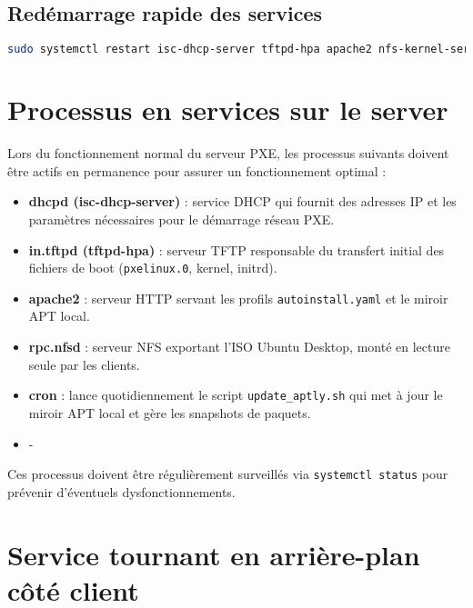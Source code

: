 \documentclass[a4paper,12pt]{article}
\begin{document}
\subsection{Redémarrage rapide des services}

\begin{lstlisting}[language=bash]
sudo systemctl restart isc-dhcp-server tftpd-hpa apache2 nfs-kernel-server
\end{lstlisting}

\section{Processus en services sur le server}
Lors du fonctionnement normal du serveur PXE, les processus suivants doivent être actifs en permanence pour assurer un fonctionnement optimal :

\begin{itemize}
\item \textbf{dhcpd (isc-dhcp-server)} : service DHCP qui fournit des adresses IP et les paramètres nécessaires pour le démarrage réseau PXE.
\item \textbf{in.tftpd (tftpd-hpa)} : serveur TFTP responsable du transfert initial des fichiers de boot (\texttt{pxelinux.0}, kernel, initrd).
\item \textbf{apache2} : serveur HTTP servant les profils \texttt{autoinstall.yaml} et le miroir APT local.
\item \textbf{rpc.nfsd} : serveur NFS exportant l'ISO Ubuntu Desktop, monté en lecture seule par les clients.
\item \textbf{cron} : lance quotidiennement le script \texttt{update\_aptly.sh} qui met à jour le miroir APT local et gère les snapshots de paquets.
\item -
\end{itemize}

Ces processus doivent être régulièrement surveillés via \texttt{systemctl status} pour prévenir d’éventuels dysfonctionnements.

\section{Service tournant en arrière-plan côté client}
\end{document}
